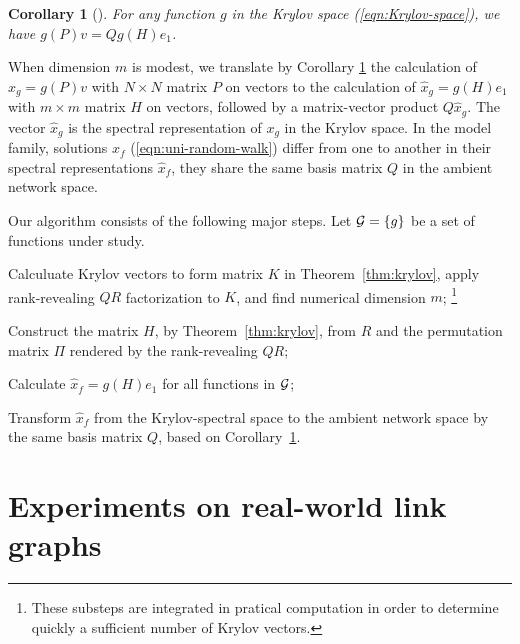 \documentclass[conference]{IEEEtran}
\begin{document}
% 
\newtheorem{corollary}{Corollary}
\setcounter{corollary}{2}
\begin{corollary}[]
\label{col:krylov}
For any function $g$ in the Krylov space (\ref{eqn:Krylov-space}), we
have $g(P)v = Qg(H)e_1$.
\end{corollary}
%
When dimension $m$ is modest, we translate by Corollary \ref{col:krylov}
the calculation of $x_{g}=g(P)v$ with $N\times N$ matrix $P$ on vectors
to the calculation of $ \hat{x}_{g} = g(H)e_1$ with $m\times m$ matrix
$H$ on vectors, followed by a matrix-vector product $Q\hat{x}_g$. The
vector $\hat{x}_g$ is the spectral representation of $x_g$ in the Krylov
space.  In the model family, solutions $x_f$ (\ref{eqn:uni-random-walk})
differ from one to another in their spectral representations
$\hat{x}_f$, they share the same basis matrix $Q$ in the ambient network
space.

Our algorithm consists of the following major steps. Let
${\cal G}= \{ g\}$ be a set of functions under study.
% 
\begin{inparaenum}[(1)] 
\item Calculuate Krylov vectors to form matrix $K$ in
  Theorem~\ref{thm:krylov}, apply rank-revealing $QR$ factorization to
  $K$, and find numerical dimension $m$; \footnote{These substeps are
    integrated in pratical computation in order to determine quickly a
    sufficient number of Krylov vectors.}
%
\item Construct the matrix $H$, by Theorem~\ref{thm:krylov},
  from $R$ and the permutation matrix $\Pi$ rendered by the
  rank-revealing $QR$;
%
\item Calculate $\hat{x}_f= g(H)e_1$ for all functions in ${\cal G}$; 
%
\item Transform $\hat{x}_f$ from the Krylov-spectral space to the
  ambient network space by the same basis matrix $Q$, based on
  Corollary~\ref{col:krylov}.
%     
\end{inparaenum}


 
%




 
% 


\section{Experiments on real-world link graphs} 
\label{sec:numerical-experiments}
%
%
\end{document}
